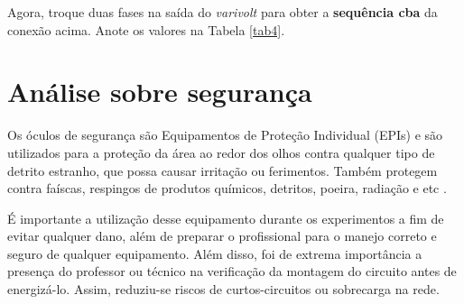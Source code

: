 \documentclass[a4paper,12pt,oneside,openany,table,xcdraw]{article}
\begin{document}
Agora, troque duas fases na saída do \textit{varivolt} para obter a \textbf{sequência cba} da conexão acima. Anote os valores na Tabela \ref{tab4}.


\begin{table}[H]\small
\centering
\def\arraystretch{1.35}
 \label{tab4}
\end{table}

\section{Análise sobre segurança} %
Os óculos de segurança são Equipamentos de Proteção Individual (EPIs) e são utilizados para a proteção da área ao redor dos olhos contra qualquer tipo de detrito estranho, que possa causar irritação ou ferimentos. Também protegem contra faíscas, respingos de produtos químicos, detritos, poeira, radiação e etc \cite{safe}.

É importante a utilização desse equipamento durante os experimentos a fim de evitar qualquer dano, além de preparar o profissional para o manejo correto e seguro de qualquer equipamento.
Além disso, foi de extrema importância a presença do professor ou técnico na verificação da montagem do circuito antes de energizá-lo. Assim, reduziu-se riscos de curtos-circuitos ou sobrecarga na rede.
\end{document}
